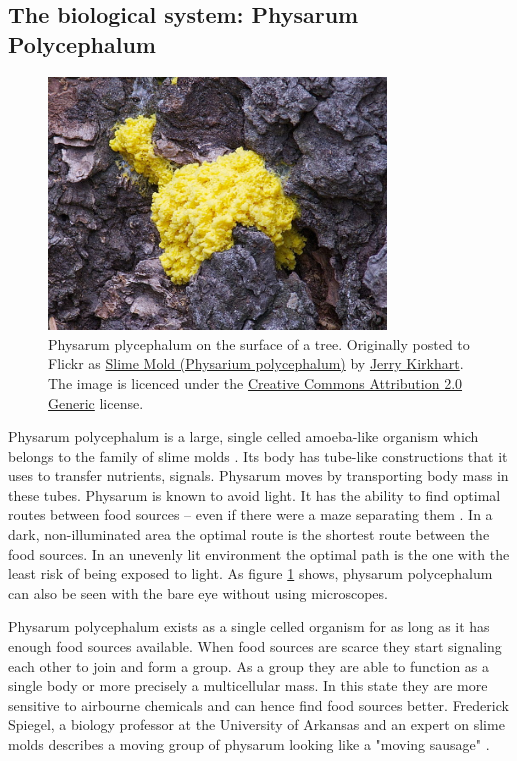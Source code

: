 \documentclass[cameraready]{IWORK2014}
\begin{document}
\subsection{The biological system: Physarum Polycephalum}

\begin{figure}
    \centering
    \includegraphics[width=0.8\textwidth]{physarum.jpg}
    \caption{ Physarum plycephalum on the surface of a tree. Originally posted to Flickr as \href{http://flickr.com/photos/33466410@N00/4988821189}{Slime Mold (Physarium polycephalum)} by \href{http://flickr.com/people/33466410@N00}{Jerry Kirkhart}. The image is licenced under the \href{http://creativecommons.org/licenses/by/2.0/deed.en}{Creative Commons Attribution 2.0 Generic} license.}
    \label{fig:physarum}
\end{figure}

Physarum polycephalum is a large, single celled amoeba-like organism which belongs to the family of slime molds \cite{liu2012physarum}. Its body has tube-like constructions that it uses to transfer nutrients, signals. Physarum moves by transporting body mass in these tubes. Physarum is known to avoid light. It has the ability to find optimal routes between food sources -- even if there were a maze separating them \cite{nakagaki2000intelligence}. In a dark, non-illuminated area the optimal route is the shortest route between the food sources. In an unevenly lit environment the optimal path is the one with the least risk of being exposed to light. As figure \ref{fig:physarum} shows, physarum polycephalum can also be seen with the bare eye without using microscopes.

Physarum polycephalum exists as a single celled organism for as long as it has enough food sources available. When food sources are scarce they start signaling each other to join and form a group. As a group they are able to function as a single body or more precisely a multicellular mass. In this state they are more sensitive to airbourne chemicals and can hence find food sources better. Frederick Spiegel, a biology professor at the University of Arkansas and an expert on slime molds describes a moving group of physarum looking like a "moving sausage" \cite{spiegel2012slimemold}.
\end{document}

